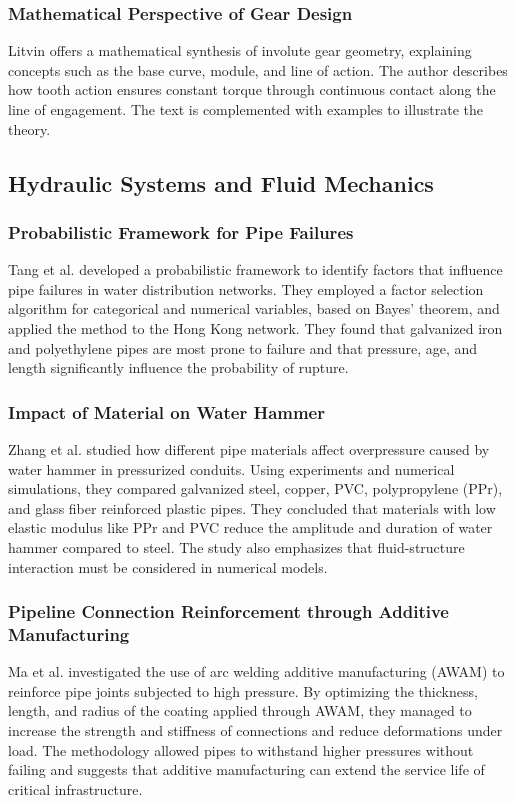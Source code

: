 \documentclass{article}
\begin{document}
\subsubsection*{Mathematical Perspective of Gear Design}
Litvin \cite{litvin1995applied} offers a mathematical synthesis of involute gear geometry, explaining concepts such as the base curve, module, and line of action.
The author describes how tooth action ensures constant torque through continuous contact along the line of engagement.
The text is complemented with examples to illustrate the theory.

\subsection*{Hydraulic Systems and Fluid Mechanics}

\subsubsection*{Probabilistic Framework for Pipe Failures}
Tang et al. \cite{tang2024probabilistic} developed a probabilistic framework to identify factors that influence pipe failures in water distribution networks.
They employed a factor selection algorithm for categorical and numerical variables, based on Bayes' theorem, and applied the method to the Hong Kong network.
They found that galvanized iron and polyethylene pipes are most prone to failure and that pressure, age, and length significantly influence the probability of rupture.

\subsubsection*{Impact of Material on Water Hammer}
Zhang et al. \cite{zhang2024waterhammer} studied how different pipe materials affect overpressure caused by water hammer in pressurized conduits.
Using experiments and numerical simulations, they compared galvanized steel, copper, PVC, polypropylene (PPr), and glass fiber reinforced plastic pipes.
They concluded that materials with low elastic modulus like PPr and PVC reduce the amplitude and duration of water hammer compared to steel.
The study also emphasizes that fluid-structure interaction must be considered in numerical models.

\subsubsection*{Pipeline Connection Reinforcement through Additive Manufacturing}
Ma et al. \cite{ma2025awam} investigated the use of arc welding additive manufacturing (AWAM) to reinforce pipe joints subjected to high pressure.
By optimizing the thickness, length, and radius of the coating applied through AWAM, they managed to increase the strength and stiffness of connections and reduce deformations under load.
The methodology allowed pipes to withstand higher pressures without failing and suggests that additive manufacturing can extend the service life of critical infrastructure.
\end{document}
